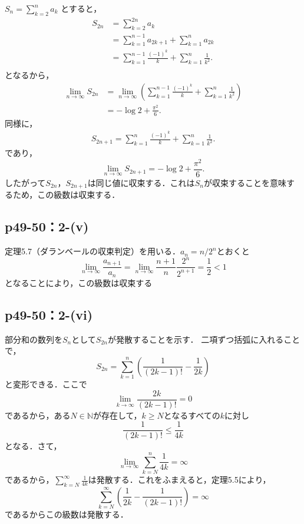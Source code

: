 \documentclass[a4paper,10pt,fleqn]{ltjsarticle}
\begin{document}
    \begin{screen}
  $S_{n} = \sum ^{n}_{k=2} a_k$ とすると，
  \begin{align*}
    S_{2n} &= \sum ^{2n}_{k=2} a_{k}\\
    &= \sum ^{n-1}_{k=1} a_{2k+1} + \sum ^{n}_{k=1} a_{2k} \\
    &= \sum ^{n-1}_{k=1} \frac{(-1)^k}{k} + \sum ^{n}_{k=1} \frac{1}{k^2}. \\
  \end{align*}
  となるから，
  \begin{align*}
   \lim_{n \to \infty} S_{2n}&=\lim_{n \to \infty} \left (\sum ^{n-1}_{k=1} \frac{(-1)^k}{k} + \sum ^{n}_{k=1} \frac{1}{k^2} \right ) \\
   & = -\log 2 + \frac{\pi^2}{6}.
  \end{align*}
  同様に，
  \begin{align*}
    S_{2n+1} = \sum ^{n}_{k=1} \frac{(-1)^k}{k} + \sum ^{n}_{k=1} \frac{1}{k^2}.
  \end{align*}
  であり，
  \[
    \lim_{n \to \infty} S_{2n+1} = -\log 2 + \frac{\pi^2}{6}.
  \]
  したがって$S_{2n}$，$S_{2n+1}$は同じ値に収束する．これは$S_{n}$が収束することを意味するため，この級数は収束する．
\end{screen}


  \subsection*{p49-50：2-(v)}


	\begin{screen}
        定理5.7（ダランベールの収束判定）を用いる．$a_n=n/2^n$とおくと
        \[
        \lim_{n \to \infty}\frac{a_{n+1}}{a_n}=\lim_{n \to \infty}\frac{n+1}{n}\frac{2^n}{2^{n+1}}=\frac{1}{2}<1
        \]
        となることにより，この級数は収束する
        \end{screen}
        
    \subsection*{p49-50：2-(vi)}

    \begin{screen}
部分和の数列を$S_{n}$として$S_{2n}$が発散することを示す． 二項ずつ括弧に入れることで，
\[
  S_{2n} = \sum ^{n}_{k=1} \left (\frac{1}{(2k-1)!} - \frac{1}{2k} \right )
\]
と変形できる．ここで
\[
\lim_{k \to \infty} \frac{2k}{(2k-1)!} = 0
\]
であるから，ある$N \in \mathbb{N}$が存在して，$k \geq N$となるすべての$k$に対し
\[
\frac{1}{(2k-1)!} \leq \frac{1}{4k}
\] 
となる．さて，
\[
  \lim_{n \to \infty} \sum ^{n}_{k=N} \frac{1}{4k} = \infty
\]
であるから，$\sum ^{\infty}_{k=N} \frac{1}{4k}$は発散する．これをふまえると，定理5.5により，
\[
  \sum^{\infty}_{k=N} \left (\frac{1}{2k} - \frac{1}{(2k-1)!}\right) =\infty
\]
であるからこの級数は発散する．
    \end{screen}
\end{document}
